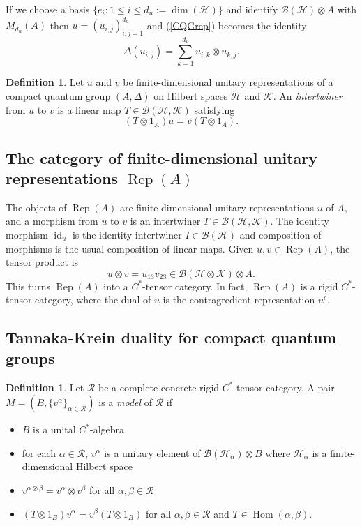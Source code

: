 \documentclass[12pt, a4paper]{amsart}
\def\dim{\operatorname{dim}}
\def\id{\operatorname{id}}
\def\Hom{\operatorname{Hom}}
\def\Rep{\operatorname{Rep}}
\def\BB{\mathcal{B}}
\def\HH{\mathcal{H}}
\def\KK{\mathcal{K}}
\def\RR{\mathcal{R}}
\theoremstyle{definition}
\newtheorem{definition}[thm]{Definition}
\theoremstyle{remark}
\numberwithin{equation}{section}
\begin{document}
If we choose a basis $\{e_i : 1\leq i \leq d_u:=\dim(\HH)\}$ and identify $\BB(\HH)\otimes A$ with $M_{d_u}(A)$ then $u = (u_{i,j})_{i,j=1}^{d_u}$ and (\ref{CQGrep}) becomes the identity
\[
 \Delta(u_{i,j}) = \sum_{k=1}^{d_u} u_{i,k}\otimes u_{k,j}.
\]
\begin{definition}
Let $u$ and $v$ be finite-dimensional unitary representations of a compact quantum group $(A,\Delta)$ on Hilbert spaces $\HH$ and $\KK$. An \emph{intertwiner} from $u$ to $v$ is a linear map $T\in\BB(\HH,\KK)$ satisfying
\[
 (T\otimes 1_A)u = v(T\otimes 1_A).
\]
\end{definition}

\subsection{The category of finite-dimensional unitary representations $\Rep(A)$}

The objects of $\Rep(A)$ are finite-dimensional unitary representations $u$ of $A$, and a morphism from $u$ to $v$ is an intertwiner $T\in\BB(\HH,\KK)$. The identity morphism $\id_u$ is the identity intertwiner $I\in\BB(\HH)$ and composition of morphisms is the usual composition of linear maps. Given $u,v\in\Rep(A)$, the tensor product is
\[
 u\otimes v = u_{13}v_{23} \in \BB(\HH\otimes\KK)\otimes A.
\]
This turns $\Rep(A)$ into a $C^*$-tensor category. In fact, $\Rep(A)$ is a rigid $C^*$-tensor category, where the dual of $u$ is the contragredient representation $u^c$.


\subsection{Tannaka-Krein duality for compact quantum groups}


\begin{definition}\label{def: model}
Let $\RR$ be a complete concrete rigid $C^*$-tensor category. A pair $M = (B,\{v^\alpha\}_{\alpha\in\RR})$ is a \emph{model} of $\RR$ if
\begin{itemize}
 \item[(i)] $B$ is a unital $C^*$-algebra
 \item[(ii)] for each $\alpha\in\RR$, $v^\alpha$ is a unitary element of $\BB(\HH_\alpha)\otimes B$ where $\HH_\alpha$ is a finite-dimensional Hilbert space
 \item[(iii)] $v^{\alpha\otimes\beta} = v^\alpha\otimes v^\beta$ for all $\alpha,\beta\in\RR$
 \item[(iv)] $(T\otimes 1_B)v^\alpha = v^\beta(T\otimes 1_B)$ for all $\alpha,\beta\in\RR$ and $T\in\Hom(\alpha,\beta)$.
\end{itemize}
\end{definition}
\end{document}
